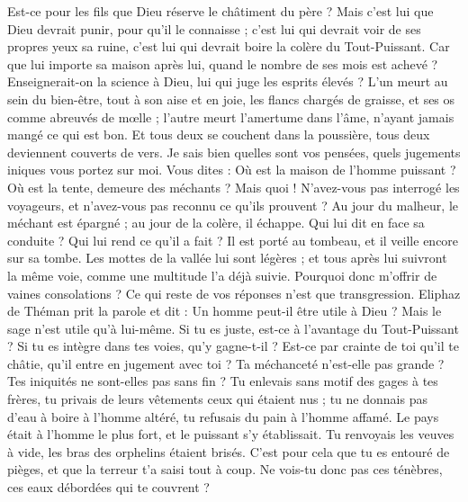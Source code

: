 \begin{multicols}{2}
Est-ce pour les fils que Dieu réserve le châtiment du père ? Mais c'est lui que Dieu devrait punir, pour qu'il le connaisse ;
c'est lui qui devrait voir de ses propres yeux sa ruine, c'est lui qui devrait boire la colère du Tout-Puissant.
Car que lui importe sa maison après lui, quand le nombre de ses mois est achevé ?
Enseignerait-on la science à Dieu, lui qui juge les esprits élevés ?
L'un meurt au sein du bien-être, tout à son aise et en joie,
les flancs chargés de graisse, et ses os comme abreuvés de mœlle ;
l'autre meurt l'amertume dans l'âme, n'ayant jamais mangé ce qui est bon.
Et tous deux se couchent dans la poussière, tous deux deviennent couverts de vers.
Je sais bien quelles sont vos pensées, quels jugements iniques vous portez sur moi.
Vous dites : Où est la maison de l'homme puissant ? Où est la tente, demeure des méchants ?
Mais quoi ! N'avez-vous pas interrogé les voyageurs, et n'avez-vous pas reconnu ce qu'ils prouvent ?
Au jour du malheur, le méchant est épargné ; au jour de la colère, il échappe.
Qui lui dit en face sa conduite ? Qui lui rend ce qu'il a fait ?
Il est porté au tombeau, et il veille encore sur sa tombe.
Les mottes de la vallée lui sont légères ; et tous après lui suivront la même voie, comme une multitude l'a déjà suivie.
Pourquoi donc m'offrir de vaines consolations ? Ce qui reste de vos réponses n'est que transgression.
\VerseOne{}Eliphaz de Théman prit la parole et dit :
Un homme peut-il être utile à Dieu ? Mais le sage n'est utile qu'à lui-même.
Si tu es juste, est-ce à l'avantage du Tout-Puissant ? Si tu es intègre dans tes voies, qu'y gagne-t-il ?
Est-ce par crainte de toi qu'il te châtie, qu'il entre en jugement avec toi ?
Ta méchanceté n'est-elle pas grande ? Tes iniquités ne sont-elles pas sans fin ?
Tu enlevais sans motif des gages à tes frères, tu privais de leurs vêtements ceux qui étaient nus ;
tu ne donnais pas d'eau à boire à l'homme altéré, tu refusais du pain à l'homme affamé.
Le pays était à l'homme le plus fort, et le puissant s'y établissait.
Tu renvoyais les veuves à vide, les bras des orphelins étaient brisés.
C'est pour cela que tu es entouré de pièges, et que la terreur t'a saisi tout à coup.
Ne vois-tu donc pas ces ténèbres, ces eaux débordées qui te couvrent ?

\end{multicols}
